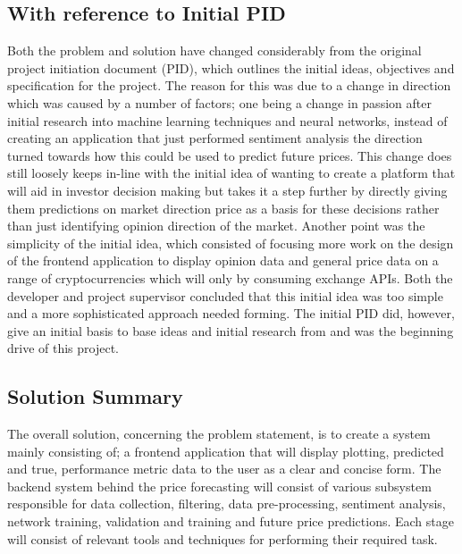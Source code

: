 \documentclass[oneside, 12pt]{article}
\begin{document}
		\subsection{With reference to Initial PID}
		Both the problem and solution have changed considerably from the original project initiation document (PID), which outlines the initial ideas, objectives and specification for the project. The reason for this was due to a change in direction which was caused by a number of factors; one being a change in passion after initial research into machine learning techniques and neural networks, instead of creating an application that just performed sentiment analysis the direction turned towards how this could be used to predict future prices. This change does still loosely keeps in-line with the initial idea of wanting to create a platform that will aid in investor decision making but takes it a step further by directly giving them predictions on market direction price as a basis for these decisions rather than just identifying opinion direction of the market. 
		Another point was the simplicity of the initial idea, which consisted of focusing more work on the design of the frontend application to display opinion data and general price data on a range of cryptocurrencies which will only by consuming exchange APIs. Both the developer and project supervisor concluded that this initial idea was too simple and a more sophisticated approach needed forming.
		The initial PID did, however, give an initial basis to base ideas and initial research from and was the beginning drive of this project.
		
		\subsection{Solution Summary}\label{summary}
		The overall solution, concerning the problem statement, is to create a system mainly consisting of; a frontend application that will display plotting, predicted and true, performance metric data to the user as a clear and concise form. The backend system behind the price forecasting will consist of various subsystem responsible for data collection, filtering, data pre-processing, sentiment analysis, network training, validation and training and future price predictions. Each stage will consist of relevant tools and techniques for performing their required task.
		
		
\end{document}
